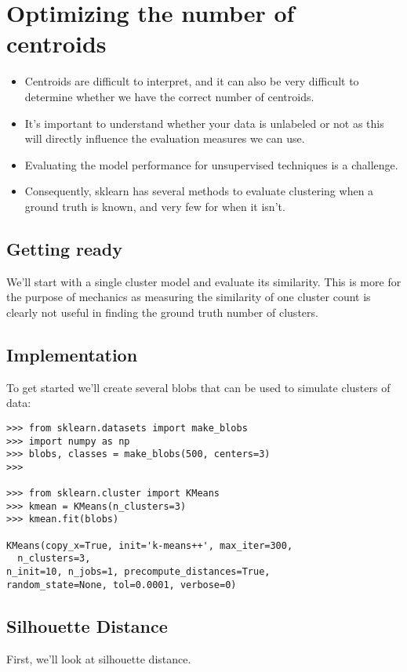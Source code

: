 \documentclass[SKL-MASTER.tex]{subfiles}
\begin{document}
\Large
\section*{Optimizing the number of centroids}
\begin{itemize}
\item Centroids are difficult to interpret, and it can also be very difficult to determine whether
we have the correct number of centroids. 
\item It's important to understand whether your data
is unlabeled or not as this will directly influence the evaluation measures we can use.

\item Evaluating the model performance for unsupervised techniques is a challenge. 
\item Consequently,
sklearn has several methods to evaluate clustering when a ground truth is known, and very
few for when it isn't.
\end{itemize}

\subsection*{Getting ready}
We'll start with a single cluster model and evaluate its similarity. This is more for the purpose
of mechanics as measuring the similarity of one cluster count is clearly not useful in finding
the ground truth number of clusters.
\subsection*{Implementation}
To get started we'll create several blobs that can be used to simulate clusters of data:
\begin{framed}
\begin{verbatim}
>>> from sklearn.datasets import make_blobs
>>> import numpy as np
>>> blobs, classes = make_blobs(500, centers=3)
>>>

>>> from sklearn.cluster import KMeans
>>> kmean = KMeans(n_clusters=3)
>>> kmean.fit(blobs)

KMeans(copy_x=True, init='k-means++', max_iter=300, 
  n_clusters=3,
n_init=10, n_jobs=1, precompute_distances=True,
random_state=None, tol=0.0001, verbose=0)
\end{verbatim}
\end{framed}
\subsection*{Silhouette Distance}
First, we'll look at silhouette distance. 
\end{document}
